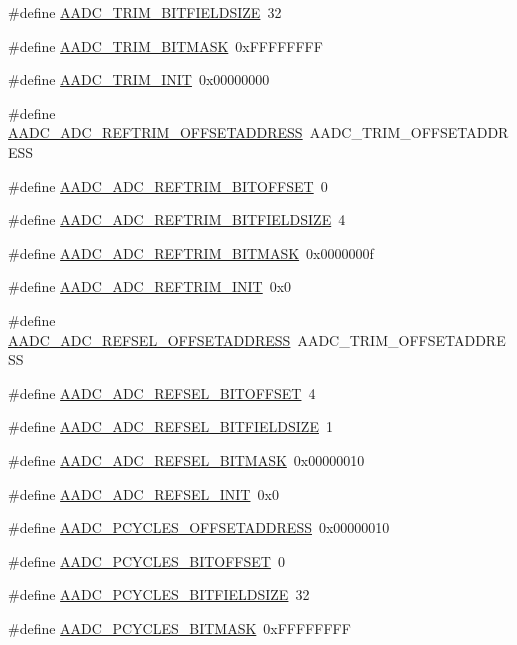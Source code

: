 \begin{DoxyCompactItemize}
\item 
\#define \hyperlink{a00543_a961e37cc150b23677ac2f2de5eb10197}{AADC\_\-TRIM\_\-BITFIELDSIZE}~32
\item 
\#define \hyperlink{a00543_a9bb7c63510eed4716b95bf244b6d40f9}{AADC\_\-TRIM\_\-BITMASK}~0xFFFFFFFF
\item 
\#define \hyperlink{a00543_a9952c6023c33c6d9fcd72adac33f7e3e}{AADC\_\-TRIM\_\-INIT}~0x00000000
\item 
\#define \hyperlink{a00543_a1089e471cee9d269c6758f1a4c043719}{AADC\_\-ADC\_\-REFTRIM\_\-OFFSETADDRESS}~AADC\_\-TRIM\_\-OFFSETADDRESS
\item 
\#define \hyperlink{a00543_a2ff0a635a79b7e26b4f54f820d814cf1}{AADC\_\-ADC\_\-REFTRIM\_\-BITOFFSET}~0
\item 
\#define \hyperlink{a00543_aeda149fe753ec8a1ce7166e90b490b37}{AADC\_\-ADC\_\-REFTRIM\_\-BITFIELDSIZE}~4
\item 
\#define \hyperlink{a00543_aa3262f6b3e6b967bedb3ba83f8b5b3dc}{AADC\_\-ADC\_\-REFTRIM\_\-BITMASK}~0x0000000f
\item 
\#define \hyperlink{a00543_a7782414d561dbd71ad2ca9c9f1f7eb9f}{AADC\_\-ADC\_\-REFTRIM\_\-INIT}~0x0
\item 
\#define \hyperlink{a00543_a28772e4f158a5b92d4db84418b883ab3}{AADC\_\-ADC\_\-REFSEL\_\-OFFSETADDRESS}~AADC\_\-TRIM\_\-OFFSETADDRESS
\item 
\#define \hyperlink{a00543_adc8e4ca2b2dca493f2e293d1a431f75e}{AADC\_\-ADC\_\-REFSEL\_\-BITOFFSET}~4
\item 
\#define \hyperlink{a00543_aaf12b4f122d06373b1b2d1438224df1f}{AADC\_\-ADC\_\-REFSEL\_\-BITFIELDSIZE}~1
\item 
\#define \hyperlink{a00543_a9b0cf1231f1a4670d84de1e9aeb43f13}{AADC\_\-ADC\_\-REFSEL\_\-BITMASK}~0x00000010
\item 
\#define \hyperlink{a00543_a68323250853cdd1079e24e3b1390aabd}{AADC\_\-ADC\_\-REFSEL\_\-INIT}~0x0
\item 
\#define \hyperlink{a00543_ae0d6153bc40f18e823ffa5d08514d49b}{AADC\_\-PCYCLES\_\-OFFSETADDRESS}~0x00000010
\item 
\#define \hyperlink{a00543_aa24237c26fe6bd8bcd21f286274510d5}{AADC\_\-PCYCLES\_\-BITOFFSET}~0
\item 
\#define \hyperlink{a00543_a96ef5de72f25961f9c98d632ecc98044}{AADC\_\-PCYCLES\_\-BITFIELDSIZE}~32
\item 
\#define \hyperlink{a00543_a7a98dc6f3de1e5d3bf0deb585b6c88ad}{AADC\_\-PCYCLES\_\-BITMASK}~0xFFFFFFFF
\item 

\end{DoxyCompactItemize}
